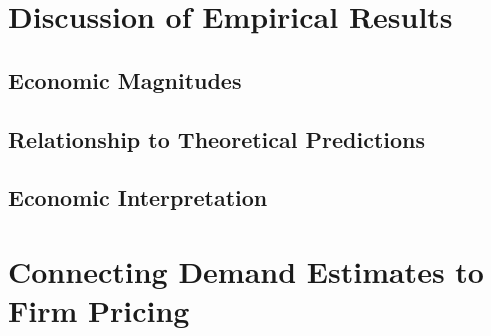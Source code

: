 \documentclass[12pt]{article}
\theoremstyle{definition}
\theoremstyle{remark}
\begin{document}
%
%
%
%



\section{Discussion of Empirical Results}
\label{sec:empirical-discussion}

\subsection{Economic Magnitudes}

%

\subsection{Relationship to Theoretical Predictions}

\subsection{Economic Interpretation}



\section{Connecting Demand Estimates to Firm Pricing}
\label{sec:supply-demand}
\end{document}
